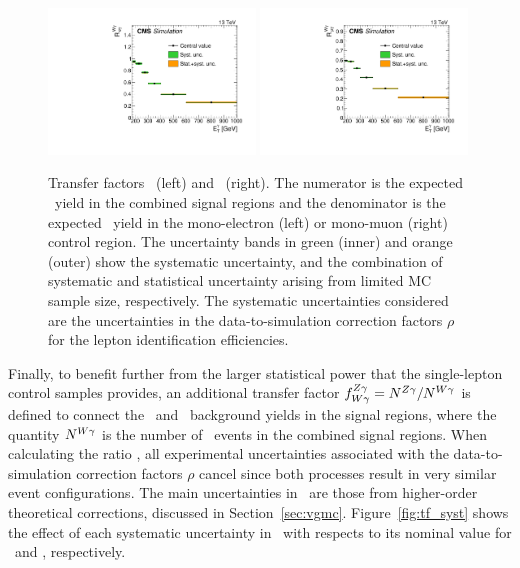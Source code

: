 \begin{figure}[htbp]
  \centering
    \includegraphics[width=0.49\textwidth]{Analysis/Figures/RWe.pdf}
    \includegraphics[width=0.49\textwidth]{Analysis/Figures/RWm.pdf}
    \caption{
      Transfer factors \RWe\ (left) and \RWm\ (right).
      The numerator is the expected \zinvg\ yield in the combined signal regions and the denominator is the expected \wlng\ yield in the mono-electron (left) or mono-muon (right) control region.
      The uncertainty bands in green (inner) and orange (outer) show the systematic uncertainty, and the combination of systematic and statistical uncertainty arising from limited MC sample size, respectively. 
      The systematic uncertainties considered are the uncertainties in the data-to-simulation correction factors $\rho$ for the lepton identification efficiencies.
    }
    \label{fig:tf_w}
\end{figure}

Finally, to benefit further from the larger statistical power that the single-lepton control samples provides, an additional transfer factor $f^{{Z}\gamma}_{{W}\gamma} = N^{{Z}\gamma}_{} / N^{{W}\gamma}_{}$ is defined to connect the \zinvg\ and \wlng\ background yields in the signal regions, where the quantity $N^{{W}\gamma}_{}$ is the number of \wlng\ events in the combined signal regions. 
When calculating the ratio \fZW, all experimental uncertainties associated with the data-to-simulation correction factors $\rho$ cancel since both processes result in very similar event configurations. 
The main uncertainties in \fZW\ are those from higher-order theoretical corrections, discussed in Section~\ref{sec:vgmc}.
Figure~\ref{fig:tf_syst} shows the effect of each systematic uncertainty in \fZW\ with respects to its nominal value for \zinvg\ and \wlng, respectively.

